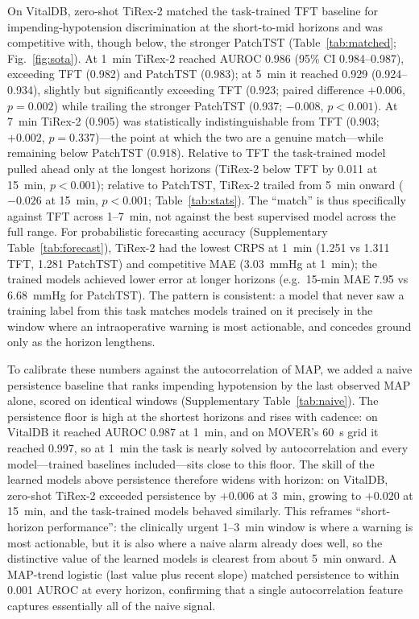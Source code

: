 \documentclass[11pt]{article}
\begin{document}
On VitalDB, zero-shot TiRex-2 matched the task-trained TFT baseline for
impending-hypotension discrimination at the short-to-mid horizons and was
competitive with, though below, the stronger PatchTST
(Table~\ref{tab:matched}; Fig.~\ref{fig:sota}). At 1~min TiRex-2
reached AUROC 0.986 (95\% CI 0.984--0.987), exceeding TFT (0.982) and
PatchTST (0.983); at 5~min it reached 0.929 (0.924--0.934), slightly but
significantly exceeding TFT (0.923; paired difference $+0.006$, $p=0.002$) while
trailing the stronger PatchTST (0.937; $-0.008$, $p<0.001$). At 7~min TiRex-2
(0.905) was statistically indistinguishable from TFT (0.903; $+0.002$,
$p=0.337$)---the point at which the two are a genuine match---while remaining
below PatchTST (0.918). Relative to TFT the task-trained model
pulled ahead only at the longest horizons (TiRex-2 below TFT by 0.011 at
15~min, $p<0.001$); relative to PatchTST, TiRex-2 trailed from 5~min onward
($-0.026$ at 15~min, $p<0.001$; Table~\ref{tab:stats}). The ``match'' is thus
specifically against TFT across 1--7~min, not against the best supervised
model across the full range.
For probabilistic forecasting accuracy (Supplementary Table~\ref{tab:forecast}), TiRex-2
had the lowest CRPS at 1~min (1.251 vs 1.311 TFT, 1.281 PatchTST) and
competitive MAE (3.03~mmHg at 1~min); the trained models achieved lower
error at longer horizons (e.g.\ 15-min MAE 7.95 vs 6.68~mmHg for PatchTST).
The pattern is consistent: a model that never saw a training label from this
task matches models trained on it precisely in the window where an
intraoperative warning is most actionable, and concedes ground only as the
horizon lengthens.

To calibrate these numbers against the autocorrelation of MAP, we added a
naive persistence baseline that ranks impending hypotension by the last
observed MAP alone, scored on identical windows (Supplementary
Table~\ref{tab:naive}). The persistence floor is high at the shortest
horizons and rises with cadence: on VitalDB it reached AUROC 0.987 at 1~min,
and on MOVER's 60~s grid it reached 0.997, so at 1~min the task is nearly
solved by autocorrelation and every model---trained baselines included---sits
close to this floor. The skill of the learned models above persistence
therefore widens with horizon: on VitalDB, zero-shot TiRex-2 exceeded
persistence by $+0.006$ at 3~min, growing to $+0.020$ at 15~min, and the
task-trained models behaved similarly. This reframes ``short-horizon
performance'': the clinically urgent 1--3~min window is where a warning is
most actionable, but it is also where a naive alarm already does well, so the
distinctive value of the learned models is clearest from about 5~min onward.
A MAP-trend logistic (last value plus recent slope) matched persistence to
within 0.001 AUROC at every horizon, confirming that a single autocorrelation
feature captures essentially all of the naive signal.
\end{document}
